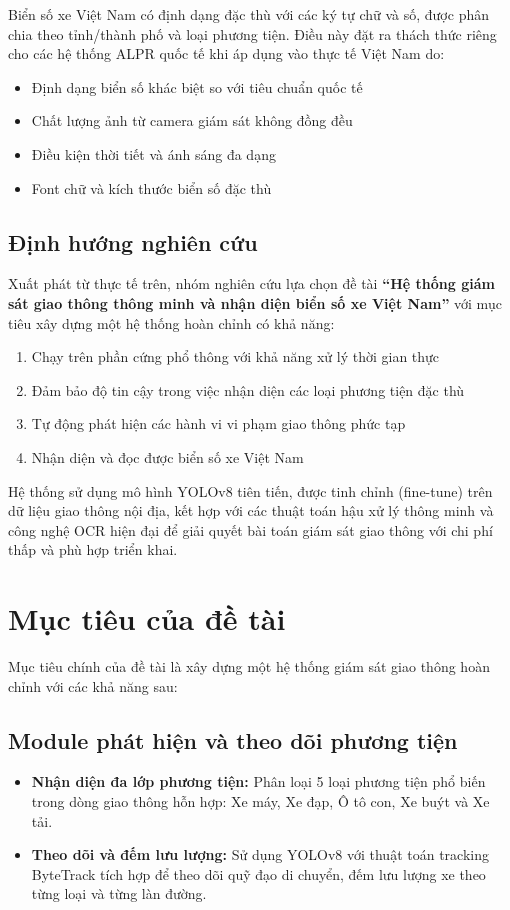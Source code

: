 Biển số xe Việt Nam có định dạng đặc thù với các ký tự chữ và số, được phân chia theo tỉnh/thành phố và loại phương tiện. Điều này đặt ra thách thức riêng cho các hệ thống ALPR quốc tế khi áp dụng vào thực tế Việt Nam do:
\begin{itemize}
    \item Định dạng biển số khác biệt so với tiêu chuẩn quốc tế
    \item Chất lượng ảnh từ camera giám sát không đồng đều
    \item Điều kiện thời tiết và ánh sáng đa dạng
    \item Font chữ và kích thước biển số đặc thù
\end{itemize}

\subsection{Định hướng nghiên cứu}
Xuất phát từ thực tế trên, nhóm nghiên cứu lựa chọn đề tài \textbf{``Hệ thống giám sát giao thông thông minh và nhận diện biển số xe Việt Nam''} với mục tiêu xây dựng một hệ thống hoàn chỉnh có khả năng:
\begin{enumerate}
    \item Chạy trên phần cứng phổ thông với khả năng xử lý thời gian thực
    \item Đảm bảo độ tin cậy trong việc nhận diện các loại phương tiện đặc thù
    \item Tự động phát hiện các hành vi vi phạm giao thông phức tạp
    \item Nhận diện và đọc được biển số xe Việt Nam
\end{enumerate}

Hệ thống sử dụng mô hình YOLOv8 tiên tiến, được tinh chỉnh (fine-tune) trên dữ liệu giao thông nội địa, kết hợp với các thuật toán hậu xử lý thông minh và công nghệ OCR hiện đại để giải quyết bài toán giám sát giao thông với chi phí thấp và phù hợp triển khai.

\section{Mục tiêu của đề tài}
Mục tiêu chính của đề tài là xây dựng một hệ thống giám sát giao thông hoàn chỉnh với các khả năng sau:

\subsection{Module phát hiện và theo dõi phương tiện}
\begin{itemize}
    \item \textbf{Nhận diện đa lớp phương tiện:} Phân loại 5 loại phương tiện phổ biến trong dòng giao thông hỗn hợp: Xe máy, Xe đạp, Ô tô con, Xe buýt và Xe tải.
    \item \textbf{Theo dõi và đếm lưu lượng:} Sử dụng YOLOv8 với thuật toán tracking ByteTrack tích hợp để theo dõi quỹ đạo di chuyển, đếm lưu lượng xe theo từng loại và từng làn đường.
\end{itemize}

